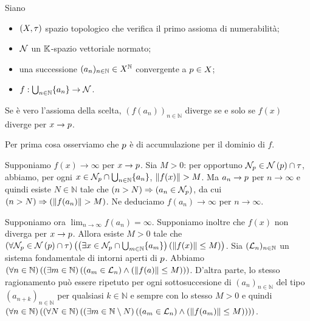 \begin{Theorem}
	Siano
	\begin{itemize}
		\item $(X,\tau)$ spazio topologico che verifica il primo assioma di numerabilit\`a;
		\item $\mathcal{N}$ un $\mathbb{K}$-spazio vettoriale normato;
		\item una successione $(a_n)_{n \in \mathbb{N}} \in X^\mathbb{N}$ convergente a $p \in X$;
		\item $f: \bigcup_{n \in \mathbb{N}} \lbrace a_n \rbrace \rightarrow \mathcal{N}$.
	\end{itemize}
	Se \`e vero l'assioma della scelta, $(f(a_n))_{n \in \mathbb{N}}$ diverge se e solo se $f(x)$ diverge per $x \rightarrow p$.
\end{Theorem}
\Proof Per prima cosa osserviamo che $p$ \`e di accumulazione per il dominio di $f$.
\par Supponiamo $f(x) \rightarrow \infty$ per $x \rightarrow p$. Sia $M > 0$: per opportuno $\Neighborhood_\AccumulationPoint \in \Neighborhoods{\AccumulationPoint} \cap \Topology$, abbiamo, per ogni $x \in \mathcal{N}_p \cap \bigcup_{n \in \mathbb{N}} \lbrace a_n \rbrace$, $\Norm{f(x)} > M$.  Ma $a_n \rightarrow p$ per $n \rightarrow \infty$ e quindi esiste $N \in \mathbb{N}$ tale che $\left ( n > N \right ) \Rightarrow \left ( a_n \in \mathcal{N}_p \right )$, da cui $\Implies{n > N}{\Norm{f(a_n)} > M}$. Ne deduciamo $f(a_n) \rightarrow \infty$ per $n \rightarrow \infty$.
\par Supponiamo ora $\lim_{n \rightarrow \infty} f(a_n) = \infty$. Supponiamo inoltre che $f(x)$ non diverga per $x \rightarrow p$. Allora esiste $M > 0$ tale che $\ForAll{\Neighborhood_\AccumulationPoint \in \Neighborhoods{\AccumulationPoint} \cap \Topology}{\Exists{x \in \Neighborhood_\AccumulationPoint \cap \bigcup_{m \in \mathbb{N}} \lbrace a_m \rbrace}{\Norm{f(x)} \leq M}}$. Sia $(\mathcal{L}_n)_{n \in \mathbb{N}}$ un sistema fondamentale di intorni aperti di $p$. Abbiamo $\ForAll{n \in \mathbb{N}}{\Exists{m \in \mathbb{N}}{\And{a_m \in \LocalBase_n}{\Norm{f(a)} \leq M}}}$. D'altra parte, lo stesso ragionamento pu\`o essere ripetuto per ogni sottosuccesione di $(a_n)_{n \in \mathbb{N}}$ del tipo $(a_{n + k})_{n \in \mathbb{N}}$ per qualsiasi $k \in \mathbb{N}$ e sempre con lo stesso $M > 0$ e quindi $\ForAll{n \in \mathbb{N}}{\ForAll{N \in \mathbb{N}}{\Exists{m \in \mathbb{N} \SetMin N}{\And{a_m \in \LocalBase_n}{\Norm{f(a_m)} \leq M}}}}$.
